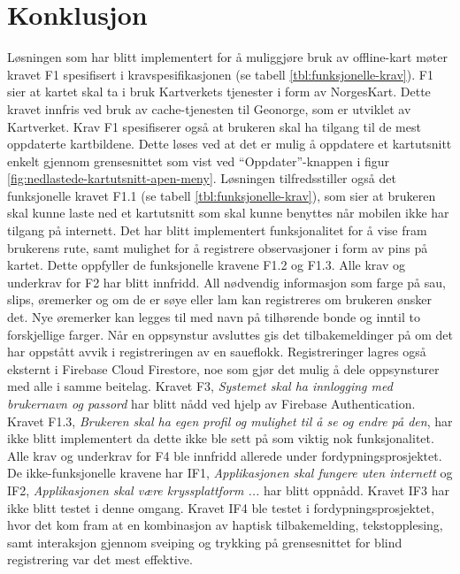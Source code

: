 \section{Konklusjon}

\noindent
Løsningen som har blitt implementert for å muliggjøre bruk av offline-kart møter kravet F1 spesifisert i kravspesifikasjonen (se tabell \ref{tbl:funksjonelle-krav}). F1 sier at kartet skal ta i bruk Kartverkets tjenester i form av NorgesKart. Dette kravet innfris ved bruk av cache-tjenesten til Geonorge, som er utviklet av Kartverket. Krav F1 spesifiserer også at brukeren skal ha tilgang til de mest oppdaterte kartbildene. Dette løses ved at det er mulig å oppdatere et kartutsnitt enkelt gjennom grensesnittet som vist ved \enquote{Oppdater}-knappen i figur \ref{fig:nedlastede-kartutsnitt-apen-meny}. Løsningen tilfredsstiller også det funksjonelle kravet F1.1 (se tabell \ref{tbl:funksjonelle-krav}), som sier at brukeren skal kunne laste ned et kartutsnitt som skal kunne benyttes når mobilen ikke har tilgang på internett. Det har blitt implementert funksjonalitet for å vise fram brukerens rute, samt mulighet for å registrere observasjoner i form av pins på kartet. Dette oppfyller de funksjonelle kravene F1.2 og F1.3. Alle krav og underkrav for F2 har blitt innfridd. All nødvendig informasjon som farge på sau, slips, øremerker og om de er søye eller lam kan registreres om brukeren ønsker det. Nye øremerker kan legges til med navn på tilhørende bonde og inntil to forskjellige farger. Når en oppsynstur avsluttes gis det tilbakemeldinger på om det har oppstått avvik i registreringen av en saueflokk. Registreringer lagres også eksternt i Firebase Cloud Firestore, noe som gjør det mulig å dele oppsynsturer med alle i samme beitelag. Kravet F3, \textit{Systemet skal ha innlogging med brukernavn og passord} har blitt nådd ved hjelp av Firebase Authentication. Kravet F1.3, \textit{Brukeren skal ha egen profil og mulighet til å se og endre på den}, har ikke blitt implementert da dette ikke ble sett på som viktig nok funksjonalitet. Alle krav og underkrav for F4 ble innfridd allerede under fordypningsprosjektet.
\newline
\newline
\noindent
 De ikke-funksjonelle kravene har IF1, \textit{Applikasjonen skal fungere uten internett} og IF2, \textit{Applikasjonen skal være kryssplattform ...} har blitt oppnådd. Kravet IF3 har ikke blitt testet i denne omgang. Kravet IF4 ble testet i fordypningsprosjektet, hvor det kom fram at en kombinasjon av haptisk tilbakemelding, tekstopplesing, samt interaksjon gjennom sveiping og trykking på grensesnittet for blind registrering var det mest effektive.